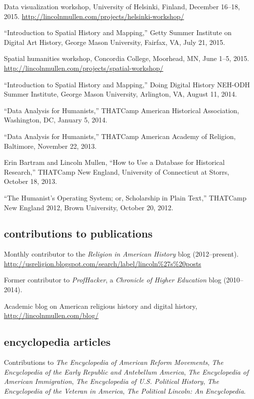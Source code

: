 \documentclass[11pt]{article}
\begin{document}
Data visualization workshop, University of Helsinki, Finland, December 16--18, 
2015. \url{http://lincolnmullen.com/projects/helsinki-workshop/}

``Introduction to Spatial History and Mapping,'' Getty Summer Institute on 
Digital Art History, George Mason University, Fairfax, VA, July 21, 2015.

Spatial humanities workshop, Concordia College, Moorhead, MN, June 1--5, 2015.  
\url{http://lincolnmullen.com/projects/spatial-workshop/}

``Introduction to Spatial History and Mapping,'' Doing Digital History NEH-ODH 
Summer Institute, George Mason University, Arlington, VA, August 11, 2014.

``Data Analysis for Humanists,'' THATCamp American Historical Association, 
Washington, DC, January 5, 2014.

``Data Analysis for Humanists,'' THATCamp American Academy of Religion, 
Baltimore, November 22, 2013.

Erin Bartram and Lincoln Mullen, ``How to Use a Database for Historical 
Research,'' THATCamp New England, University of Connecticut at Storrs, October 
18, 2013.

``The Humanist's Operating System; or, Scholarship in Plain Text,'' THATCamp 
New England 2012, Brown University, October 20, 2012.


\subsection{contributions to
  publications}\label{contributions-to-publications}

Monthly contributor to the \emph{Religion in American History} blog (2012--present). \url{http://usreligion.blogspot.com/search/label/lincoln\%27s\%20posts}

Former contributor to \emph{ProfHacker}, a \emph{Chronicle of Higher 
  Education} blog (2010--2014). 

Academic blog on American religious history and digital history, 
\url{http://lincolnmullen.com/blog/}

\subsection{encyclopedia articles}\label{encyclopedia-articles}

Contributions to \emph{The Encyclopedia of American Reform Movements},
\emph{The Encyclopedia of the Early Republic and Antebellum America},
\emph{The Encyclopedia of American Immigration},
\emph{The Encyclopedia of U.S. Political History},
\emph{The Encyclopedia of the Veteran in America},
\emph{The Political Lincoln: An Encyclopedia}.
\end{document}
